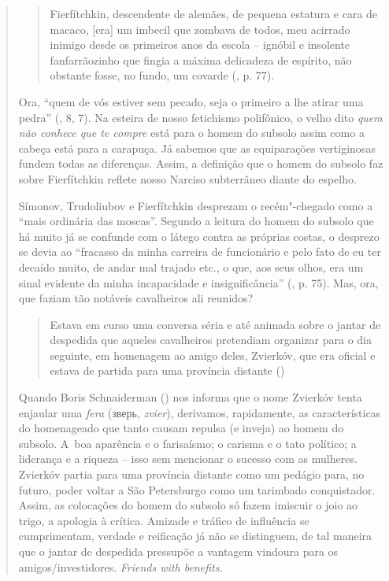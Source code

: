 {\begin{quote}
\begin{quote}
Fierfítchkin, descendente de alemães, de pequena estatura e cara de
macaco, {[}era{]} um imbecil que zombava de todos, meu acirrado inimigo
desde os primeiros anos da escola -- ignóbil e insolente fanfarrãozinho
que fingia a máxima delicadeza de espírito, não obstante fosse, no
fundo, um covarde (, p. 77).
\end{quote}

Ora, ``quem de vós estiver sem pecado, seja o primeiro a lhe atirar uma
pedra'' (, 8, 7). Na esteira de nosso fetichismo polifônico, o velho
dito \emph{quem não conhece que te compre} está para o homem do subsolo
assim como a cabeça está para a carapuça. Já sabemos que as equiparações
vertiginosas fundem todas as diferenças. Assim, a definição que o homem
do subsolo faz sobre Fierfítchkin reflete nosso Narciso subterrâneo
diante do espelho.

Símonov, Trudoliubov e Fierfítchkin desprezam o recém"-chegado como a
``mais ordinária das moscas''. Segundo a leitura do homem do subsolo que
há muito já se confunde com o látego contra as próprias costas, o
desprezo se devia ao ``fracasso da minha carreira de funcionário e pelo
fato de eu ter decaído muito, de andar mal trajado etc., o que, aos seus
olhos, era um sinal evidente da minha incapacidade e insignificância''
(, p. 75). Mas, ora, que faziam tão notáveis cavalheiros ali
reunidos?

\begin{quote}
Estava em curso uma conversa séria e até animada sobre o jantar de
despedida que aqueles cavalheiros pretendiam organizar para o dia
seguinte, em homenagem ao amigo deles, Zvierkóv, que era oficial e
estava de partida para uma província distante ()
\end{quote}

Quando Boris Schnaiderman () nos informa que o nome Zvierkóv tenta
enjaular uma \emph{fera}
(зверь,
\emph{zvier}), derivamos, rapidamente, as características do homenageado
que tanto causam repulsa (e inveja) ao homem do subsolo. A~boa aparência
e o farisaísmo; o carisma e o tato político; a liderança e a riqueza --
isso sem mencionar o sucesso com as mulheres. Zvierkóv partia para uma
província distante como um pedágio para, no futuro, poder voltar a São
Petersburgo como um tarimbado conquistador. Assim, as colocações do
homem do subsolo só fazem imiscuir o joio ao trigo, a apologia à
crítica. Amizade e tráfico de influência se cumprimentam, verdade e
reificação já não se distinguem, de tal maneira que o jantar de
despedida pressupõe a vantagem vindoura para os amigos/investidores.
\emph{Friends with benefits.}


\end{quote}}
